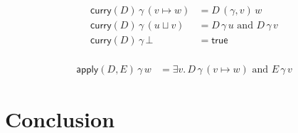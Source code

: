 \documentclass{article}
\newcommand{\true}[0]{\mathsf{true}}
\newcommand{\curry}[1]{\mathsf{curry}(#1)}
\newcommand{\apply}[2]{\mathsf{apply}(#1, #2)}
\begin{document}
\begin{align*}
  \curry{D}\, \gamma\, (v \mapsto w) &= D \,(\gamma,v)\, w\\
  \curry{D}\, \gamma\, (u \sqcup v) &= D \,\gamma\, u \text{ and } D\, \gamma\, v \\
  \curry{D}\, \gamma\, \bot &= \true \\
\end{align*}


\begin{align*}
  \apply{D}{E}\,\gamma\,w &=
    \exists v.\, D\,\gamma\,(v \mapsto w) \text{ and } E \, \gamma \, v
\end{align*}

\section{Conclusion}
\end{document}
